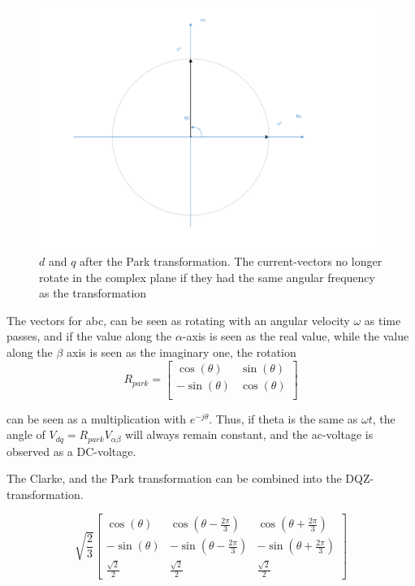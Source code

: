 \begin{figure}
    \centering
    \includegraphics[width=\textwidth,height=\textheight,keepaspectratio]{Figures/Park_transformed.pdf}
    \caption{$d$ and $q$ after the Park transformation. The current-vectors no longer rotate in the complex plane if they had the same angular frequency as the transformation}
    \label{fig:Park_transformed}
\end{figure}

The vectors for abc, can be seen as rotating with an angular velocity $\omega$ as time passes, and if the value along the $\alpha$-axis is seen as the real value, while the value along the $\beta$ axis is seen as the imaginary one, the rotation 
\begin{equation}
    R_{park} = \begin{bmatrix}
       \cos{\left(\theta\right)} & \sin{\left(\theta\right)} \\
       -\sin{\left(\theta\right)} & \cos{\left(\theta\right)}\\

    \end{bmatrix}
\end{equation}

can be seen as a multiplication with $e^{-j\theta}$. Thus, if theta is the same as $\omega t$, the angle of $V_{dq} = R_{park}V_{\alpha\beta}$ will always remain constant, and the ac-voltage is observed as a DC-voltage. 

The Clarke, and the Park transformation can be combined into the DQZ-transformation. 

\begin{equation}
 \sqrt{\frac{2}{3}}\begin{bmatrix}
   \cos{\left(\theta\right)}
      & \cos{\left(\theta - \frac{2\pi}{3}\right)}
      & \cos{\left(\theta + \frac{2\pi}{3}\right)} \\
   -\sin{\left(\theta\right)}
      & -\sin{\left(\theta - \frac{2\pi}{3}\right)}
      & -\sin{\left(\theta + \frac{2\pi}{3}\right)} \\
   \frac{\sqrt{2}}{2}
      & \frac{\sqrt{2}}{2}
      & \frac{\sqrt{2}}{2}
\end{bmatrix}
\end{equation}{}


